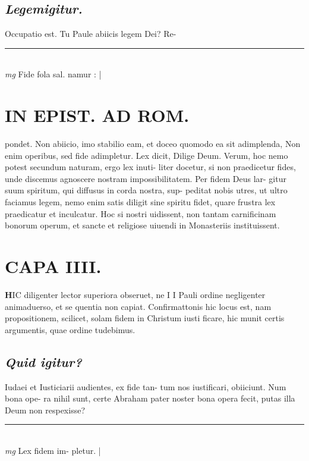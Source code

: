 \documentclass{article}
\begin{document}
\begin{pages}
\subsection*{\textit{Legemigitur. }}\pstart Occupatio est. Tu Paule abiicis legem Dei? Re-  \pend
\vspace{0.5cm}\noindent
\vspace{0.2cm}\rule{1cm}{0.2pt}\\ 
\hspace{0.2cm}\textit{mg}
\footnotesize Fide fola sal. namur : 
\normalsize| 
\section*{IN EPIST. AD ROM.  }
\marginpar{[ p.38 ]}\pstart pondet. Non abiicio, imo stabilio eam, et doceo quomodo ea sit adimplenda, Non enim operibus, sed fide adimpletur. Lex dicit, Dilige Deum. Verum, hoc nemo potest secundum naturam, ergo lex inuti- liter docetur, si non praedicetur fides, unde discemus agnoscere nostram impossibilitatem. Per fidem Deus lar- gitur suum spiritum, qui diffusus in corda nostra, sup- peditat nobis utres, ut ultro faciamus legem, nemo enim satis diligit sine spiritu fidet, quare frustra lex praedicatur et inculcatur. Hoc si nostri uidissent, non tantam carnificinam bonorum operum, et sancte et religiose uiuendi in Monasteriis instituissent.   \pend
\endnumbering\beginnumbering\section{CAPA IIII.}\pstart \huge\textbf{H}\normalsize IC diligenter lector superiora obseruet, ne I I Pauli ordine negligenter animaduerso, et se quentia non capiat. Confirmattonis hic locus est, nam propositionem, scilicet, solam fidem in Christum iusti ficare, hic munit certis argumentis, quae ordine tudebimus.   \pend
{}
{}
\subsection*{\textit{Quid igitur? }}\pstart Iudaei et Iusticiarii audientes, ex fide tan- tum nos iustificari, obiiciunt. Num bona ope- ra nihil sunt, certe Abraham pater noster bona opera fecit, putas illa Deum non respexisse?  \pend
\vspace{0.5cm}\noindent
\vspace{0.2cm}\rule{1cm}{0.2pt}\\ 
\hspace{0.2cm}\textit{mg}
\footnotesize Lex fidem im- pletur.  
\normalsize| 

\end{pages}
\end{document}
